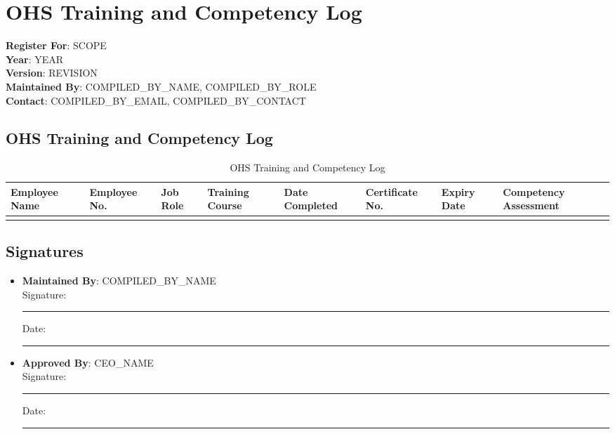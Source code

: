 \documentclass[11pt]{article}
\newcommand{\docTitle}{OHS Training and Competency Log}
\newcommand{\scope}{{{SCOPE}}}
\newcommand{\year}{{{YEAR}}}
\newcommand{\compilerName}{{{COMPILED_BY_NAME}}}
\newcommand{\compilerRole}{{{COMPILED_BY_ROLE}}}
\newcommand{\compilerEmail}{{{COMPILED_BY_EMAIL}}}
\newcommand{\compilerPhone}{{{COMPILED_BY_CONTACT}}}
\newcommand{\revision}{{{REVISION}}}
\begin{document}
\section*{\docTitle}
\textbf{Register For}: \scope \\
\textbf{Year}: \year \\
\textbf{Version}: \revision \\
\textbf{Maintained By}: \compilerName, \compilerRole \\
\textbf{Contact}: \compilerEmail, \compilerPhone

\subsection*{OHS Training and Competency Log}

\begin{table}[h]
    \centering
    \begin{tabular}{p{2cm}p{2cm}p{2cm}p{2cm}p{2cm}p{2cm}p{2cm}p{2cm}}
        \toprule
        \textbf{Employee Name} & \textbf{Employee No.} & \textbf{Job Role} & \textbf{Training Course} & \textbf{Date Completed} & \textbf{Certificate No.} & \textbf{Expiry Date} & \textbf{Competency Assessment} \\
        \midrule
        & & & & & & & \\
        \bottomrule
    \end{tabular}
    \caption{OHS Training and Competency Log}
\end{table}

\subsection*{Signatures}
\begin{itemize}
  \item \textbf{Maintained By}: \compilerName \\
    Signature: \rule{5cm}{0.4pt} \quad Date: \rule{3cm}{0.4pt}
  \item \textbf{Approved By}: {{CEO_NAME}} \\
    Signature: \rule{5cm}{0.4pt} \quad Date: \rule{3cm}{0.4pt}
\end{itemize}
\end{document}

